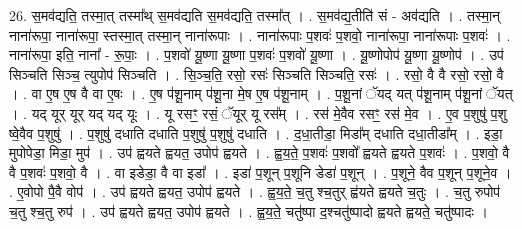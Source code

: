 \documentclass[17pt]{extarticle}
\begin{document}
26. स॒मव॑द्यति॒ तस्मा॒त् तस्मा᳚थ् स॒मव॑द्यति स॒मव॑द्यति॒ तस्मा᳚त् । . स॒मव॑द्य॒तीति॑ सं - अव॑द्यति । . तस्मा॒न् नाना॑रूपा॒ नाना॑रूपा॒ स्तस्मा॒त् तस्मा॒न् नाना॑रूपाः । . नाना॑रूपाः प॒शवः॑ प॒शवो॒ नाना॑रूपा॒ नाना॑रूपाः प॒शवः॑ । . नाना॑रूपा॒ इति॒ नाना᳚ - रू॒पाः॒ । . प॒शवो॑ यू॒ष्णा यू॒ष्णा प॒शवः॑ प॒शवो॑ यू॒ष्णा । . यू॒ष्णोपोप॑ यू॒ष्णा यू॒ष्णोप॑ । . उप॑ सिञ्चति सिञ्च॒ त्युपोप॑ सिञ्चति । . सि॒ञ्च॒ति॒ रसो॒ रसः॑ सिञ्चति सिञ्चति॒ रसः॑ । . रसो॒ वै वै रसो॒ रसो॒ वै । . वा ए॒ष ए॒ष वै वा ए॒षः । . ए॒ष प॑शू॒नाम् प॑शू॒ना मे॒ष ए॒ष प॑शू॒नाम् । . प॒शू॒नां ॅयद् यत् प॑शू॒नाम् प॑शू॒नां ॅयत् । . यद् यूर् यूर् यद् यद् यूः । . यू रसꣳ॒॒ रसं॒ ॅयूर् यू रस᳚म् । . रस॑ मे॒वैव रसꣳ॒॒ रस॑ मे॒व । . ए॒व प॒शुषु॑ प॒शु ष्वे॒वैव प॒शुषु॑ । . प॒शुषु॑ दधाति दधाति प॒शुषु॑ प॒शुषु॑ दधाति । . द॒धा॒तीडा॒ मिडा᳚म् दधाति दधा॒तीडा᳚म् । . इडा॒ मुपोपेडा॒ मिडा॒ मुप॑ । . उप॑ ह्वयते ह्वयत॒ उपोप॑ ह्वयते । . ह्व॒य॒ते॒ प॒शवः॑ प॒शवो᳚ ह्वयते ह्वयते प॒शवः॑ । . प॒शवो॒ वै वै प॒शवः॑ प॒शवो॒ वै । . वा इडेडा॒ वै वा इडा᳚ । . इडा॑ प॒शून् प॒शूनि डेडा॑ प॒शून् । . प॒शूने॒ वैव प॒शून् प॒शूने॒व । . ए॒वोपो पै॒वै वोप॑ । . उप॑ ह्वयते ह्वयत॒ उपोप॑ ह्वयते । . ह्व॒य॒ते॒ च॒तु श्च॒तुर् ह्व॑यते ह्वयते च॒तुः । . च॒तु रुपोप॑ च॒तु श्च॒तु रुप॑ । . उप॑ ह्वयते ह्वयत॒ उपोप॑ ह्वयते । . ह्व॒य॒ते॒ चतु॑ष्पा द॒श्चतु॑ष्पादो ह्वयते ह्वयते॒ चतु॑ष्पादः । \newline
\end{document}
